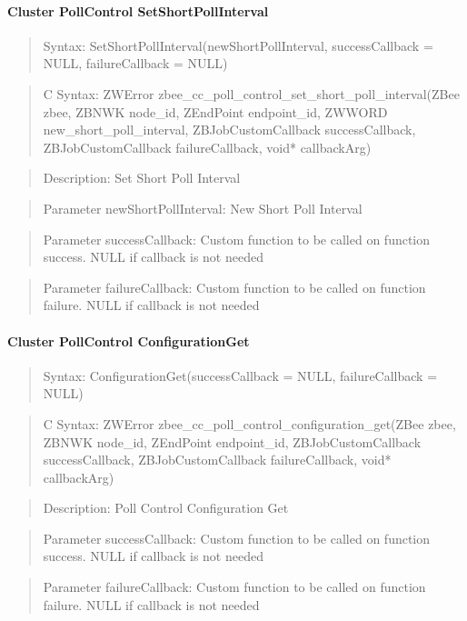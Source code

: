 \paragraph{Cluster PollControl SetShortPollInterval}
\begin{quote}Syntax: SetShortPollInterval(newShortPollInterval, successCallback = NULL, failureCallback = NULL)\end{quote}
\begin{quote}C Syntax: ZWError zbee\_cc\_poll\_control\_set\_short\_poll\_interval(ZBee zbee, ZBNWK node\_id, ZEndPoint endpoint\_id, ZWWORD new\_short\_poll\_interval, ZBJobCustomCallback successCallback, ZBJobCustomCallback failureCallback, void* callbackArg)\end{quote}
\begin{quote}Description: Set Short Poll Interval\end{quote}
\begin{quote}Parameter newShortPollInterval: New Short Poll Interval\end{quote}
\begin{quote}Parameter successCallback: Custom function to be called on function success. NULL if callback is not needed\end{quote}
\begin{quote}Parameter failureCallback: Custom function to be called on function failure. NULL if callback is not needed\end{quote}


\paragraph{Cluster PollControl ConfigurationGet}
\begin{quote}Syntax: ConfigurationGet(successCallback = NULL, failureCallback = NULL)\end{quote}
\begin{quote}C Syntax: ZWError zbee\_cc\_poll\_control\_configuration\_get(ZBee zbee, ZBNWK node\_id, ZEndPoint endpoint\_id, ZBJobCustomCallback successCallback, ZBJobCustomCallback failureCallback, void* callbackArg)\end{quote}
\begin{quote}Description: Poll Control Configuration Get\end{quote}
\begin{quote}Parameter successCallback: Custom function to be called on function success. NULL if callback is not needed\end{quote}
\begin{quote}Parameter failureCallback: Custom function to be called on function failure. NULL if callback is not needed\end{quote}



